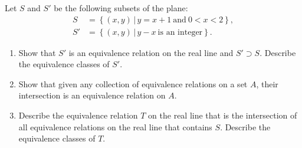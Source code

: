 \documentclass[12pt]{article}
\newenvironment{problem}[2][Exercise]{\begin{trivlist}
\item[\hskip \labelsep {\bfseries #1}\hskip \labelsep {\bfseries #2.}]}{\end{trivlist}}
\begin{document}
\begin{problem}{1.3.5}
Let $S$ and $S'$ be the following subsets of the plane:
\begin{equation*}
\begin{split} 
S &= \left\{ \left(x,y\right) \, | \, y = x+1 ~ \text{and} ~ 0 < x <2 \right\}, \\
S' & = \left\{ \left(x,y\right) \, | \, y-x ~\text{is an integer}\right\}.
\end{split}
\end{equation*}
\begin{enumerate}[label=(\alph*)]
	\item Show that $S'$ is an equivalence relation on the real line and $S' \supset S$. Describe the equivalence classes of $S'$.
	\item Show that given any collection of equivalence relations on a set $A$, their intersection is an equivalence relation on $A$.
	\item Describe the equivalence relation $T$ on the real line that is the intersection of all equivalence relations on the real line that contains $S$. Describe the equivalence classes of $T$.
\end{enumerate}
\end{problem}
\end{document}
